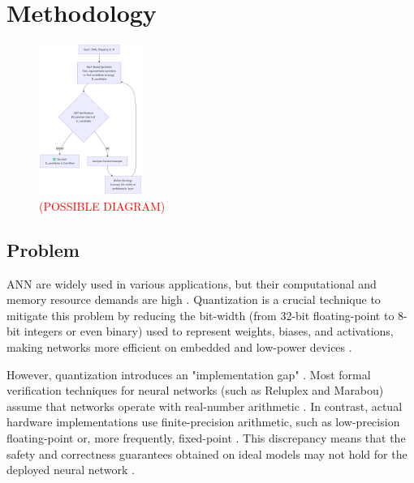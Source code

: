 \chapter{Methodology} \label{chap:metodologia}

\begin{figure}
\centering
\includegraphics[width=0.3\textwidth]{figuras/3-metodologia/frameworkDiagram.png}
\caption{\textcolor{red}{(POSSIBLE DIAGRAM)}}
\label{fig:frameworkDiagram}
\end{figure}
\newpage
\section{Problem}

ANN are widely used in various applications, but their computational and memory resource demands are high \cite{amir2021smt, han2020understanding, abdi2021counterexample, song2023qnnrepair}. Quantization is a crucial technique to mitigate this problem by reducing the bit-width (from 32-bit floating-point to 8-bit integers or even binary) used to represent weights, biases, and activations, making networks more efficient on embedded and low-power devices \cite{amir2021smt, han2020understanding,song2023qnnrepair, abdi2021counterexample, Cai2020Certified}.

However, quantization introduces an "implementation gap" \cite{cordeiro2025neuralnetworkverificationprogramming}. Most formal verification techniques for neural networks (such as Reluplex and Marabou) assume that networks operate with real-number arithmetic \cite{katz2017reluplex,amir2021smt}. In contrast, actual hardware implementations use finite-precision arithmetic, such as low-precision floating-point or, more frequently, fixed-point \cite{han2020understanding}. This discrepancy means that the safety and correctness guarantees obtained on ideal models may not hold for the deployed neural network \cite{abdi2021counterexample}.

